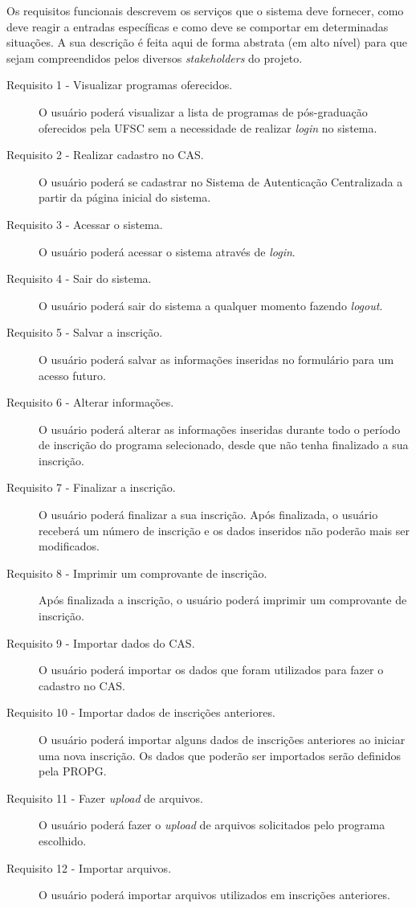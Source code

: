 \documentclass[
  10.5pt,				  %
	openright,			%
	twoside,			  %
  a5paper,
  chapter=TITLE,	%
	section=TITLE,	%
  hyphens,        %
	english,        %
	brazil          %
]{abntex2}
\begin{document}
Os requisitos funcionais descrevem os serviços que o sistema deve fornecer, como deve reagir a entradas específicas e como deve se comportar em determinadas situações. A sua descrição é feita aqui de forma abstrata (em alto nível) para que sejam compreendidos pelos diversos \emph{stakeholders} do projeto.

\begin{description}
\item[Requisito 1 - Visualizar programas oferecidos.] O usuário poderá visualizar a lista de programas de pós-graduação oferecidos pela UFSC sem a necessidade de realizar \emph{login} no sistema.
\item[Requisito 2 - Realizar cadastro no CAS.] O usuário poderá se cadastrar no Sistema de Autenticação Centralizada a partir da página inicial do sistema.
\item[Requisito 3 - Acessar o sistema.] O usuário poderá acessar o sistema através de \emph{login}.
\item[Requisito 4 - Sair do sistema.] O usuário poderá sair do sistema a qualquer momento fazendo \emph{logout}.
\item[Requisito 5 - Salvar a inscrição.] O usuário poderá salvar as informações inseridas no formulário para um acesso futuro.
\item[Requisito 6 - Alterar informações.] O usuário poderá alterar as informações inseridas durante todo o período de inscrição do programa selecionado, desde que não tenha finalizado a sua inscrição.
\item[Requisito 7 - Finalizar a inscrição.] O usuário poderá finalizar a sua inscrição. Após finalizada, o usuário receberá um número de inscrição e os dados inseridos não poderão mais ser modificados.
\item[Requisito 8 - Imprimir um comprovante de inscrição.] Após finalizada a inscrição, o usuário poderá imprimir um comprovante de inscrição.
\item[Requisito 9 - Importar dados do CAS.] O usuário poderá importar os dados que foram utilizados para fazer o cadastro no CAS.
\item[Requisito 10 - Importar dados de inscrições anteriores.] O usuário poderá importar alguns dados de inscrições anteriores ao iniciar uma nova inscrição. Os dados que poderão ser importados serão definidos pela PROPG.
\item[Requisito 11 - Fazer \emph{upload} de arquivos.] O usuário poderá fazer o \emph{upload} de arquivos solicitados pelo programa escolhido.
\item[Requisito 12 - Importar arquivos.] O usuário poderá importar arquivos utilizados em inscrições anteriores.

\end{description}
\end{document}
